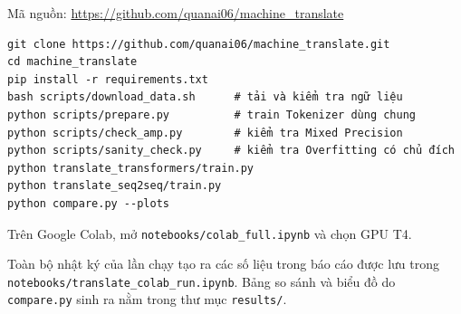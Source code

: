 \documentclass[11pt,a4paper]{article}
\newcommand{\file}[1]{\texttt{\small #1}}
\begin{document}
Mã nguồn: \url{https://github.com/quanai06/machine_translate}

\begin{verbatim}
git clone https://github.com/quanai06/machine_translate.git
cd machine_translate
pip install -r requirements.txt
bash scripts/download_data.sh      # tải và kiểm tra ngữ liệu
python scripts/prepare.py          # train Tokenizer dùng chung
python scripts/check_amp.py        # kiểm tra Mixed Precision
python scripts/sanity_check.py     # kiểm tra Overfitting có chủ đích
python translate_transformers/train.py
python translate_seq2seq/train.py
python compare.py --plots
\end{verbatim}

Trên Google Colab, mở \file{notebooks/colab\_full.ipynb} và chọn GPU T4.

Toàn bộ nhật ký của lần chạy tạo ra các số liệu trong báo cáo được lưu trong
\file{notebooks/translate\_colab\_run.ipynb}. Bảng so sánh và biểu đồ do
\file{compare.py} sinh ra nằm trong thư mục \file{results/}.
\end{document}
